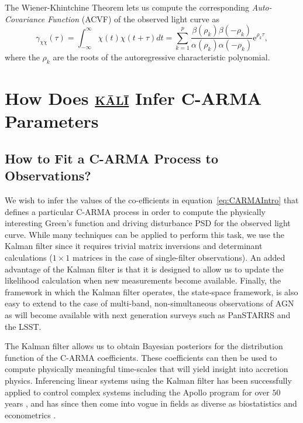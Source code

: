 \documentclass[a4paper,fleqn,usenatbib]{mnras}
\begin{document}
The Wiener-Khintchine Theorem lets us compute the corresponding \textit{Auto-Covariance Function} (ACVF) of the observed light curve \citep{HandbookOfStatistics19Brockwell} as
\begin{equation}\label{eq:CARMAACVF}
\gamma_{\chi\chi}(\tau) = \int_{-\infty}^{\infty}\chi(t)\chi(t + \tau) dt = \sum_{k = 1}^{p} \frac{\beta(\rho_{k}) \beta(-\rho_{k})}{\alpha(\rho_{k})\alpha(-\rho_{k})}\mathrm{e}^{\rho_{k} \tau},
\end{equation}
where the $\rho_{k}$ are the roots of the autoregressive characteristic polynomial.

\section[\href{https://github.com/AstroVPK/kali}{\textsc{k\={a}l\={i}}}]{How Does \href{https://github.com/AstroVPK/kali}{\textsc{k\={a}l\={i}}} Infer C-ARMA Parameters}\label{sec:kali}

\subsection[Fitting C-ARMA Processes]{How to Fit a C-ARMA Process to Observations?}\label{sec:Fitting}

We wish to infer the values of the co-efficients in equation~\eqref{eq:CARMAIntro} that defines a particular C-ARMA process in order to compute the physically interesting Green's function and driving disturbance PSD for the observed light curve. While many techniques can be applied to perform this task, we use the Kalman filter \citep{Kalman60, Simon} since it requires trivial matrix inversions and determinant calculations ($1 \times 1$ matrices in the case of single-filter observations). An added advantage of the Kalman filter is that it is designed to allow us to update the likelihood calculation when new measurements become available. Finally, the framework in which the Kalman filter operates, the state-space framework, is also easy to extend to the case of multi-band, non-simultaneous observations of AGN as will become available with next generation surveys such as PanSTARRS and the LSST.

The Kalman filter allows us to obtain Bayesian posteriors for the distribution function of the C-ARMA coefficients. These coefficients can then be used to compute physically meaningful time-scales that will yield insight into accretion physics. Inferencing linear systems using the Kalman filter has been successfully applied to control complex systems including the Apollo program for over $50$ years \citep{GrewalAndrews10}, and has since then come into vogue in fields as diverse as biostatistics \citep{Jones} and econometrics \citep{DurbinKoopman,Harvey}.
\end{document}
